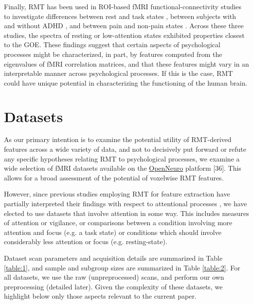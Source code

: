 \documentclass[12pt]{spieman}  %
\begin{document}
\begin{spacing}{2}
Finally, RMT has been used in ROI-based fMRI functional-connectivity studies to investigate
differences between rest and task states , between
subjects with and without ADHD , and between pain and non-pain
states . Across these three studies, the spectra of
resting or low-attention states exhibited properties closest to the GOE. These findings suggest that
certain aspects of psychological processes might be characterized, in part, by features computed
from the eigenvalues of fMRI correlation matrices, and that these features might vary in an
interpretable manner across psychological processes. If this is the case, RMT could have unique
potential in characterizing the functioning of the human brain.

\section{Datasets}

As our primary intention is to examine the potential utility of RMT-derived features across a wide
variety of data, and not to decisively put forward or refute any specific hypotheses relating RMT to
psychological processes, we examine a wide selection of fMRI datasets available on the
\href{https://openneuro.org/}{OpenNeuro} platform [36].  This allows for a broad assessment of the
potential of voxelwise RMT features.

However, since previous studies employing RMT for feature extraction have partially interpreted
their findings with respect to attentional processes
, we have elected to use
datasets that involve attention in some way. This includes measures of attention or vigilance, or
comparisons between a condition involving more attention and focus (e.g. a task state) or conditions
which should involve considerably less attention or focus (e.g. resting-state).

Dataset scan parameters and acquisition details are summarized in Table \ref{table:1}, and sample
and subgroup sizes are summarized in Table \ref{table:2}. For all datasets, we use the raw
(unpreprocessed) scans, and perform our own preprocessing (detailed later). Given the complexity of
these datasets, we highlight below only those aspects relevant to the current paper.


\end{spacing}
\end{document}
